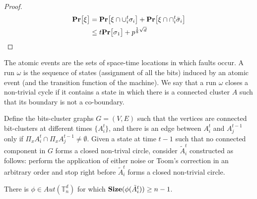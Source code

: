 \begin{proof}
\begin{equation*}
  \begin{split}
    \mathbf{Pr} \big[ \xi \big] & =  \mathbf{Pr} \big[ \xi \cap \cup^{t}_{i} \sigma_{i}  \big] +  \mathbf{Pr} \big[ \xi \cap \cap^{t}_{i} \bar{\sigma}_{i}  \big] \\
    & \le t \mathbf{Pr} \big[  \sigma_{1}  \big] + p^{\frac{1}{8} \sqrt{d}}  
  \end{split}
\end{equation*}

\end{proof}

\begin{definition}
The atomic events are the sets of space-time locations in which faults occur. A run $\omega$ is the sequence of states (assignment of all the bits) induced by an atomic event (and the transition function of the machine). We say that a run $\omega$ closes a non-trivial cycle if it contains a state in which there is a connected cluster $A$ such that its boundary is not a co-boundary.
\end{definition}


Define the bits-cluster graphs $G=(V,E)$ such that the vertices are connected bit-clusters at different times $\{A_{i}^{t}\}$, and there is an edge between $A_{i}^{t}$ and $A_{j}^{t-1}$ only if $\Pi_{x} A_{i}^{t} \cap \Pi_{x} A_{j}^{t-1} \neq \emptyset$. Given a state at time $t-1$ such that no connected component in $G$ forms a closed non-trival circle, consider $\tilde{A}_{i}^{t}$ constructed as follows: perform the application of either noise or Toom's correction in an arbitrary order and stop right before $\tilde{A}_{i}^{t}$ forms a closed non-trivial circle.

\begin{claim}
  \label{claim:closes}
  There is $\phi \in Aut(\mathbb{T}^{d}_{n})$ for which $\mathbf{Size}( \phi( \tilde{A}_{i}^{t}) ) \ge n-1$.
\end{claim}

